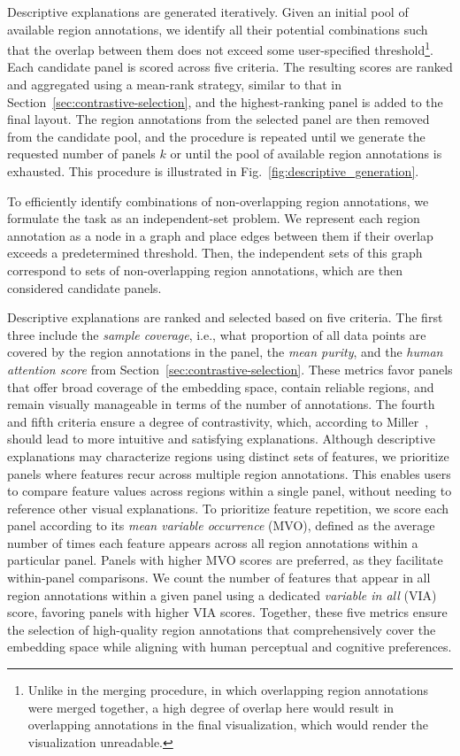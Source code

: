 \documentclass[lettersize,journal]{IEEEtran}
\begin{document}
Descriptive explanations are generated iteratively.
Given an initial pool of available region annotations, we identify all their potential combinations such that the overlap between them does not exceed some user-specified threshold\footnote{Unlike in the merging procedure, in which overlapping region annotations were merged together, a high degree of overlap here would result in overlapping annotations in the final visualization, which would render the visualization unreadable.}.
Each candidate panel is scored across five criteria. The resulting scores are ranked and aggregated using a mean-rank strategy, similar to that in Section~\ref{sec:contrastive-selection}, and the highest-ranking panel is added to the final layout.
The region annotations from the selected panel are then removed from the candidate pool, and the procedure is repeated until we generate the requested number of panels $k$ or until the pool of available region annotations is exhausted. This procedure is illustrated in Fig.~\ref{fig:descriptive_generation}.

To efficiently identify combinations of non-overlapping region annotations, we formulate the task as an independent-set problem. We represent each region annotation as a node in a graph and place edges between them if their overlap exceeds a predetermined threshold. Then, the independent sets of this graph correspond to sets of non-overlapping region annotations, which are then considered candidate panels.

Descriptive explanations are ranked and selected based on five criteria.
The first three include the \textit{sample coverage}, i.e., what proportion of all data points are covered by the region annotations in the panel, the \textit{mean purity}, and the \textit{human attention score} from Section~\ref{sec:contrastive-selection}.
These metrics favor panels that offer broad coverage of the embedding space, contain reliable regions, and remain visually manageable in terms of the number of annotations.
The fourth and fifth criteria ensure a degree of contrastivity, which, according to Miller~\cite{Miller2019}, should lead to more intuitive and satisfying explanations.
Although descriptive explanations may characterize regions using distinct sets of features, we prioritize panels where features recur across multiple region annotations. This enables users to compare feature values across regions within a single panel, without needing to reference other visual explanations.
To prioritize feature repetition, we score each panel according to its \textit{mean variable occurrence} (MVO), defined as the average number of times each feature appears across all region annotations within a particular panel.
Panels with higher MVO scores are preferred, as they facilitate within-panel comparisons.
We count the number of features that appear in all region annotations within a given panel using a dedicated \textit{variable in all} (VIA) score, favoring panels with higher VIA scores.
Together, these five metrics ensure the selection of high-quality region annotations that comprehensively cover the embedding space while aligning with human perceptual and cognitive preferences.
\end{document}
